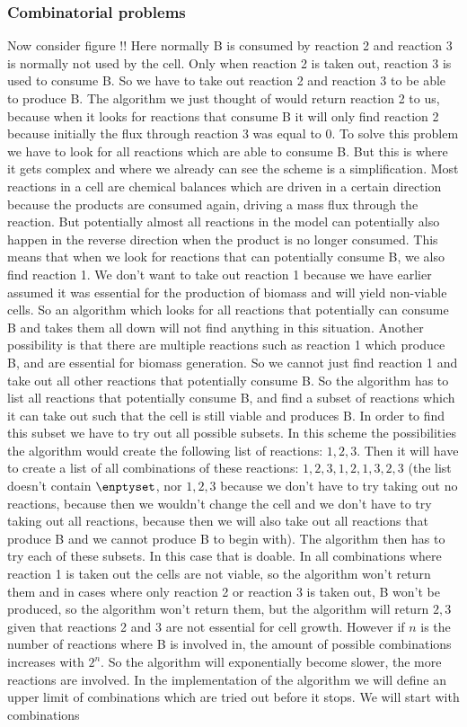 \documentclass[10pt]{report}
\begin{document}
\subsubsection{Combinatorial problems}
Now consider figure !! Here normally B is consumed by reaction 2 and reaction 3 is normally not used by the cell. Only when reaction 2 is taken out, reaction 3 is used to consume B. So we have to take out reaction 2 and reaction 3 to be able to produce B. The algorithm we just thought of would return reaction 2 to us, because when it looks for reactions that consume B it will only find reaction 2 because initially the flux through reaction 3 was equal to 0. To solve this problem we have to look for all reactions which are able to consume B. But this is where it gets complex and where we already can see the scheme is a simplification. Most reactions in a cell are chemical balances which are driven in a certain direction because the products are consumed again, driving a mass flux through the reaction. But potentially almost all reactions in the model can potentially also happen in the reverse direction when the product is no longer consumed. This means that when we look for reactions that can potentially consume B, we also find reaction 1. We don't want to take out reaction 1 because we have earlier assumed it was essential for the production of biomass and will yield non-viable cells. So an algorithm which looks for all reactions that potentially can consume B and takes them all down will not find anything in this situation. Another possibility is that there are multiple reactions such as reaction 1 which produce B, and are essential for biomass generation. So we cannot just find reaction 1 and take out all other reactions that potentially consume B. So the algorithm has to list all reactions that potentially consume B, and find a subset of reactions which it can take out such that the cell is still viable and produces B. In order to find this subset we have to try out all possible subsets. In this scheme the possibilities the algorithm would create the following list of reactions: ${1, 2, 3}$. Then it will have to create a list of all combinations of these reactions: ${{1},{2},{3},{1,2},{1,3},{2,3}}$ (the list doesn't contain $\enptyset$, nor ${1,2,3}$ because we don't have to try taking out no reactions, because then we wouldn't change the cell and we don't have to try taking out all reactions, because then we will also take out all reactions that produce B and we cannot produce B to begin with). The algorithm then has to try each of these subsets. In this case that is doable. In all combinations where reaction 1 is taken out the cells are not viable, so the algorithm won't return them and in cases where only reaction 2 or reaction 3 is taken out, B won't be produced, so the algorithm won't return them, but the algorithm will return ${2,3}$ given that reactions 2 and 3 are not essential for cell growth. However if $n$ is the number of reactions where B is involved in, the amount of possible combinations increases with $2^n$. So the algorithm will exponentially become slower, the more reactions are involved. In the implementation of the algorithm we will define an upper limit of combinations which are tried out before it stops. We will start with combinations 
\end{document}
